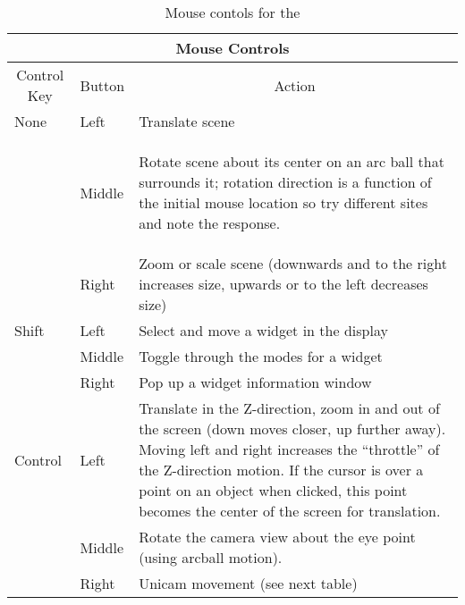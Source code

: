 \begin{table}[htb]
\begin{center}
  \begin{tabular}{|l|l|p{5in}|} \hline
    \multicolumn{3}{|c|}{\large Mouse Controls}\\ \hline \hline 
    \multicolumn{1}{|c|}{Control Key} & 
    \multicolumn{1}{|c|}{Button} & 
    \multicolumn{1}{|c|}{Action}\\ \hline
None & Left & Translate scene \\
     & Middle & \begin{raggedleft} Rotate scene about its center on an arc
    ball that surrounds it; rotation direction is a function of the
    initial mouse location so try different sites and note the
    response. \end{raggedleft}\\  
     & Right & Zoom or scale scene (downwards and to the right increases
     size, upwards or to the left decreases size) \\ \hline
Shift & Left & Select and move a widget in the display \\
      & Middle & Toggle through the modes for a widget \\
      & Right & Pop up a widget information window \\ \hline
Control & Left & Translate in the Z-direction, \ie{} zoom in and out of the
    screen (down moves closer, up further away).  Moving left and
    right increases the ``throttle'' of the Z-direction motion.  If
    the cursor is over a point on an object when clicked, this point
    becomes the center of the screen for translation.\\ 
      & Middle & Rotate the camera view about the eye point (using arcball
    motion). \\ 
      & Right & Unicam movement (see next table)\\ \hline
\end{tabular}
\caption{\label{tab:view-mouse} Mouse contols for the \viewer{}}
\end{center}
\end{table}

\bigskip

